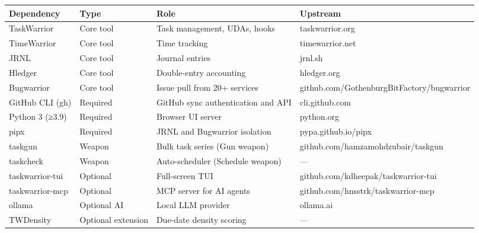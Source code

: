 \documentclass[11pt, a4paper, DIV=14]{scrartcl}
\newcounter{none}
\begin{document}
{\def\LTcaptype{none} %
\begin{longtable}[]{@{}
  >{\raggedright\arraybackslash}p{}
  >{\raggedright\arraybackslash}p{}
  >{\raggedright\arraybackslash}p{}
  >{\raggedright\arraybackslash}p{}@{}}
\toprule\noalign{}
\begin{minipage}[b]{\linewidth}\raggedright
Dependency
\end{minipage} & \begin{minipage}[b]{\linewidth}\raggedright
Type
\end{minipage} & \begin{minipage}[b]{\linewidth}\raggedright
Role
\end{minipage} & \begin{minipage}[b]{\linewidth}\raggedright
Upstream
\end{minipage} \\
\midrule\noalign{}
\endhead
\bottomrule\noalign{}
\endlastfoot
TaskWarrior & Core tool & Task management, UDAs, hooks &
taskwarrior.org \\
TimeWarrior & Core tool & Time tracking & timewarrior.net \\
JRNL & Core tool & Journal entries & jrnl.sh \\
Hledger & Core tool & Double-entry accounting & hledger.org \\
Bugwarrior & Core tool & Issue pull from 20+ services &
github.com/GothenburgBitFactory/bugwarrior \\
GitHub CLI (gh) & Required & GitHub sync authentication and API &
cli.github.com \\
Python 3 (≥3.9) & Required & Browser UI server & python.org \\
pipx & Required & JRNL and Bugwarrior isolation & pypa.github.io/pipx \\
taskgun & Weapon & Bulk task series (Gun weapon) &
github.com/hamzamohdzubair/taskgun \\
taskcheck & Weapon & Auto-scheduler (Schedule weapon) & --- \\
taskwarrior-tui & Optional & Full-screen TUI &
github.com/kdheepak/taskwarrior-tui \\
taskwarrior-mcp & Optional & MCP server for AI agents &
github.com/hnsstrk/taskwarrior-mcp \\
ollama & Optional AI & Local LLM provider & ollama.ai \\
TWDensity & Optional extension & Due-date density scoring & --- \\
\end{longtable}
}
\end{document}
